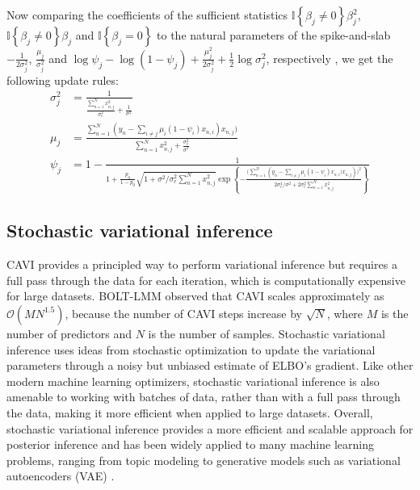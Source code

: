 %
Now comparing the coefficients of the sufficient statistics $\mathbb{I}\left\{\beta_j \ne 0\right\} \beta_j^2$, $\mathbb{I}\left\{\beta_j \ne 0\right\} \beta_j$ and $\mathbb{I}\left\{\beta_j = 0\right\}$ to the natural parameters of the spike-and-slab $-\frac{1}{2\sigma_j^2}$, $\frac{\mu_j}{\sigma_j^2}$ and $\log \psi_j - \log (1-\psi_j) + \frac{\mu_j^2}{2\sigma_j^2} + \frac{1}{2}\log \sigma_j^2$, respectively \cite{spence2020flexible}, we get the following update rules:
\begin{align}
    \sigma_j^2 &= \frac{1}{\frac{\sum_{n=1}^N x^2_{n,j}}{ \sigma_e^2} + \frac{1}{\sigma^2}} \nonumber \\
    \mu_j &= \frac{\sum_{n=1}^N (y_n - \sum_{i \ne j} \mu_i (1- \psi_i) x_{n,i}) x_{n,j})}{\sum_{n=1}^N x^2_{n,j} + \frac{\sigma_e^2}{\sigma^2}} \nonumber \\
    \psi_j &= 1 - \frac{1}{1 + \frac{p_0}{1-p_0}\sqrt{1 + \sigma^2 / \sigma_e^2 \sum_{n=1}^N x^2_{n,j} }  \exp\left\{ - \frac{\Big( \sum_{n=1}^N \left( y_n - \sum_{i \ne j} \mu_i (1- \psi_i) x_{n,i}) x_{n,j} \right) \Big)^2}{2\sigma_e^4/ \sigma^2 + 2\sigma_e^2\sum_{n=1}^N x^2_{n,j}}\right\}}
\label{eq:cavi_2_update_psi}
\end{align}

\subsection{Stochastic variational inference}
\label{sec:ch4-theory-svi}
%
CAVI provides a principled way to perform variational inference but requires a full pass through the data for each iteration, which is computationally expensive for large datasets.
%
BOLT-LMM \cite{loh2015efficient} \cite{loh2018mixed} observed that CAVI scales approximately as $\mathcal{O}(MN^{1.5})$, because the number of CAVI steps increase by $\sqrt{N}$, where $M$ is the number of predictors and $N$ is the number of samples.
%
Stochastic variational inference \cite{hoffman2013stochastic} uses ideas from stochastic optimization \cite{robbins1951stochastic} to update the variational parameters through a noisy but unbiased estimate of ELBO's gradient.
%
Like other modern machine learning optimizers, stochastic variational inference is also amenable to working with batches of data, rather than with a full pass through the data, making it more efficient when applied to large datasets.
%
Overall, stochastic variational inference provides a more efficient and scalable approach for posterior inference and has been widely applied to many machine learning problems, ranging from topic modeling \cite{hoffman2013stochastic} to generative models such as variational autoencoders (VAE) \cite{kingma2013auto}.
%

